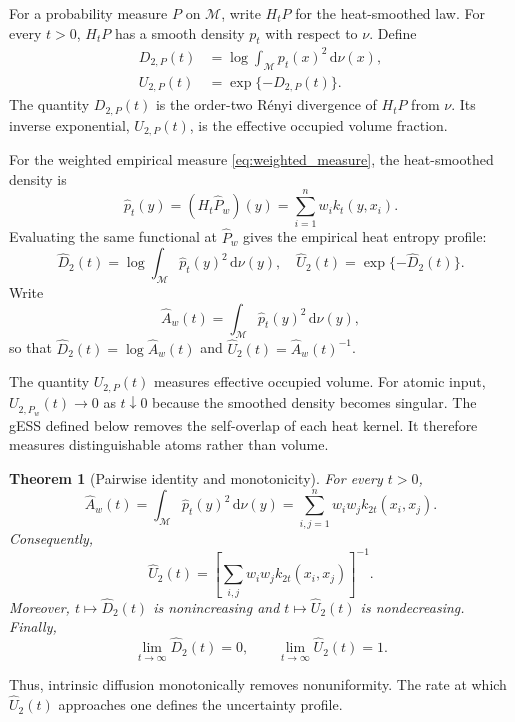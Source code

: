 \documentclass[twoside]{article}
\newtheorem{theorem}{Theorem}
\theoremstyle{definition}
\theoremstyle{remark}
\newcommand{\M}{\mathcal{M}}
\newcommand{\dd}{\,\mathrm{d}}
\begin{document}
For a probability measure $P$ on $\M$, write $H_tP$ for the heat-smoothed law.
For every $t>0$, $H_tP$ has a smooth density $p_t$ with respect to $\nu$.
Define
\begin{align*}
  D_{2,P}(t)&=\log\int_\M p_t(x)^2\dd\nu(x),\\
  U_{2,P}(t)&=\exp\{-D_{2,P}(t)\}.
\end{align*}
The quantity $D_{2,P}(t)$ is the order-two R\'enyi divergence of $H_tP$ from $\nu$. Its inverse exponential, $U_{2,P}(t)$, is the effective occupied volume fraction.

For the weighted empirical measure \eqref{eq:weighted_measure}, the
heat-smoothed density is
\begin{equation}
  \widehat p_t(y)=(H_t\widehat P_w)(y)
  =\sum_{i=1}^n w_i k_t(y,x_i).
  \label{eq:pt_def}
\end{equation}
Evaluating the same functional at $\widehat P_w$ gives the empirical heat entropy profile:
\[
  \widehat D_2(t)=\log\int_\M \widehat p_t(y)^2\dd\nu(y),
  \quad
  \widehat U_2(t)=\exp\{-\widehat D_2(t)\}.
\]
Write
\[
  \widehat A_w(t)=\int_\M \widehat p_t(y)^2\dd\nu(y),
\]
so that $\widehat D_2(t)=\log \widehat A_w(t)$ and
$\widehat U_2(t)=\widehat A_w(t)^{-1}$.

The quantity $U_{2,P}(t)$ measures effective occupied volume. For atomic input, $U_{2,\widehat P_w}(t)\to0$ as $t\downarrow0$ because the smoothed density becomes singular. The gESS defined below removes the self-overlap of each heat kernel. It therefore measures distinguishable atoms rather than volume.

\begin{theorem}[Pairwise identity and monotonicity]
\label{thm:pairwise_monotone}
For every $t>0$,
\begin{equation}
  \widehat A_w(t)
  =
  \int_\M \widehat p_t(y)^2\dd\nu(y)
  =
  \sum_{i,j=1}^n w_iw_jk_{2t}(x_i,x_j).
  \label{eq:pairwise_identity}
\end{equation}
Consequently,
\[
  \widehat U_2(t)
  =
  \left[\sum_{i,j}w_iw_jk_{2t}(x_i,x_j)\right]^{-1}.
\]
Moreover, $t\mapsto \widehat D_2(t)$ is nonincreasing and
$t\mapsto \widehat U_2(t)$ is nondecreasing. Finally,
\[
  \lim_{t\to\infty}\widehat D_2(t)=0,
  \qquad
  \lim_{t\to\infty}\widehat U_2(t)=1.
\]
\end{theorem}

Thus, intrinsic diffusion monotonically removes nonuniformity. The rate at which $\widehat U_2(t)$ approaches one defines the uncertainty profile.
\end{document}
